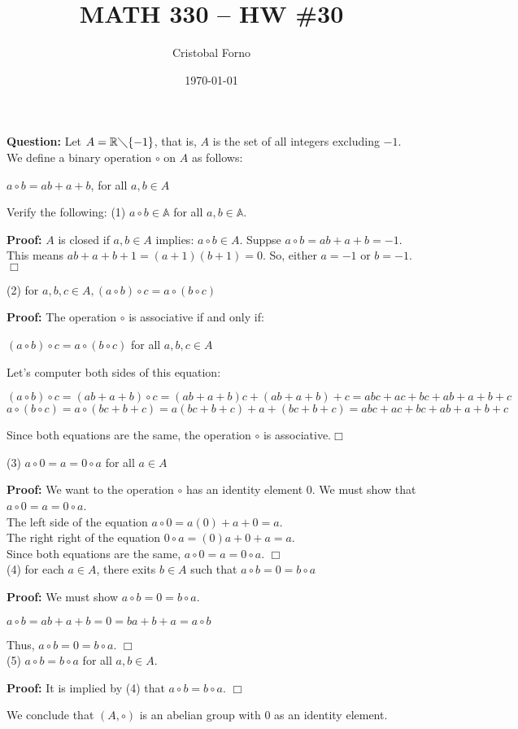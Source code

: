 \documentclass[12pt]{article}
\title{MATH 330 -- HW \#30}
\author{Cristobal Forno}
\date{\today}
\begin{document}
\maketitle

\textbf{Question:} Let $A = \mathbb{R} \diagdown \{-1\}$, that is, $A$ is the set of all
integers excluding $-1$. We define a binary operation $\circ$ on $A$ as follows:
\begin{center}
  $a \circ b = ab +a +b$, for all $a,b \in A$
\end{center}
Verify the following:
\newline
(1) $a \circ b \in \mathbb{A}$ for all $a,b \in \mathbb{A}$.

\noindent
\textbf{Proof:}
$A$ is closed if $a, b \in A$ implies: $a \circ b \in A$. Suppse $a \circ b = ab +
a + b = -1$. This means $ab + a + b +1 = (a+1) (b+1) = 0$. So, either $a = -1$ or
$b = -1$. $\Box$

\noindent
(2) for $a, b, c \in A, (a \circ b) \circ c = a \circ (b \circ c)$

\noindent
\textbf{Proof:}
The operation $\circ$ is associative if and only if:
\begin{center}
  $(a \circ b) \circ c = a \circ (b \circ c)$ for all $a, b, c \in A$
\end{center}
Let's computer both sides of this equation:
\begin{center}
  $(a \circ b) \circ c = (ab + a + b) \circ c = (ab+a+b)c + (ab+a+b) + c =
  abc+ac+bc+ab+a+b+c$\\
  $a \circ (b \circ c) = a \circ (bc + b +c) = a(bc+b+c)+a+(bc+b+c) =
  abc+ac+bc+ab+a+b+c$
\end{center}
Since both equations are the same, the operation $\circ$ is associative.$\Box$
  
\noindent
(3) $a \circ 0 = a = 0 \circ a$ for all $a \in A$

\noindent
\textbf{Proof:}
We want to the operation $\circ$ has an identity element $0$. We must show that $a \circ 0 = a = 0 \circ a$.\\
The left side of the equation $a \circ 0 = a(0)+a +0 = a$.\\
The right right of the equation $0 \circ a = (0)a + 0 + a = a$.\\
Since both equations are the same, $a \circ 0 = a = 0 \circ a$. $\Box$ \\

\noindent
(4) for each $a \in A$, there exits $b \in A$ such that $a \circ b = 0 = b \circ
a$

\noindent
\textbf{Proof:}
We must show $a \circ b = 0 = b \circ a$.\\
\begin{center}
  $a \circ b = ab+a+b = 0 = ba+b+a = a \circ b$
\end{center}
  Thus, $a \circ b = 0 = b \circ a$. $\Box$ \\
\noindent
(5) $a \circ b = b \circ a$ for all $a, b \in A$.

\noindent
\textbf{Proof:}
It is implied by (4) that $a \circ b = b \circ a$. $\Box$

\noindent
We conclude that $(A, \circ)$ is an abelian group with $0$ as an identity element.
\end{document}
